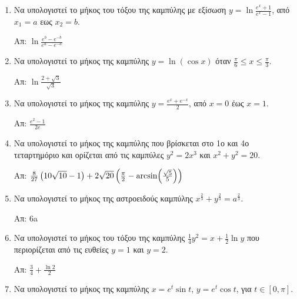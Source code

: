 


\everymath{\displaystyle}
\thispagestyle{empty}



\begin{center}
\end{center}

\vspace{\baselineskip}

\begin{enumerate}

	\item Να υπολογιστεί το μήκος του τόξου της καμπύλης με εξίσωση $ y =
		\ln{\frac{e^{x} + 1}{e^{x} - 1}}$, από $ x_{1} = a $ εως $ x_{2} = b $.

		\hfill Απ: $ \ln{\frac{e^{b} - e^{-b}}{e^{a} - e^{-a}}} $

	\item Να υπολογιστεί το μήκος της καμπύλης $y=\ln(\cos x)$ όταν $\frac{\pi}{6}\leq x
		\leq \frac{\pi}{3}$.

		\hfill Απ: $\ln\frac{2+\sqrt{3}}{\sqrt{3}}$

	\item Να υπολογιστεί το μήκος της καμπύλης $y=\frac{e^{x}+e^{-x}}{2}$, από $x=0$ έως $x=1$.

		\hfill Απ: $\frac{e^{2}-1}{2e}$

	\item Να υπολογιστεί το μήκος της καμπύλης που βρίσκεται στο 1ο και 4ο
		τεταρτημόριο και ορίζεται από τις καμπύλες $ y^{2} = 2x^{3} $ και $ x^{2} +
		y^{2} = 20 $.

		\hfill Απ: $ \frac{8}{27} \left(10 \sqrt{10} -1\right) + 2 \sqrt{20}
		\left(\frac{\pi}{2} - \arcsin\Bigl(\frac{\sqrt{5}}{5}\Bigr)\right) $ 

	\item Να υπολογιστεί το μήκος της αστροειδούς καμπύλης $ x^{\frac{2}{3}}
		+ y^{\frac{2}{3}} = a^{\frac{2}{3}} $.

		\hfill Απ: 6a

	\item Να υπολογιστεί το μήκος του τόξου της καμπύλης $ \frac{1}{4} y^{2} = x +
		\frac{1}{2} \ln{y} $ που περιορίζεται από τις ευθείες $ y = 1 $ και $ y =
		2$.

		\hfill Απ: $ \frac{3}{4} + \frac{\ln{2}}{2} $

	\item Να υπολογιστεί το μήκος της καμπύλης $ x = e^{t} \sin{t} $, $ y = e^{t}
		\cos{t} $, για $ t \in [0, \pi] $.


\end{enumerate}
